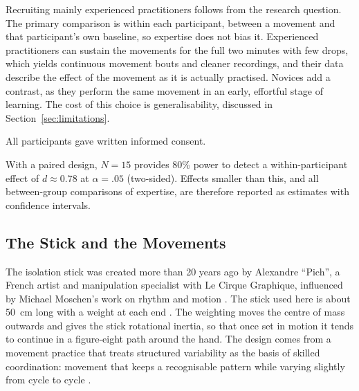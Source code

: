 Recruiting mainly experienced practitioners follows from the research question. The primary comparison is within each participant, between a movement and that participant's own baseline, so expertise does not bias it. Experienced practitioners can sustain the movements for the full two minutes with few drops, which yields continuous movement bouts and cleaner recordings, and their data describe the effect of the movement as it is actually practised. Novices add a contrast, as they perform the same movement in an early, effortful stage of learning. The cost of this choice is generalisability, discussed in Section~\ref{sec:limitations}.

All participants gave written informed consent. 

With a paired design, $N = 15$ provides 80\% power to detect a within-participant effect of $d \approx 0.78$ at $\alpha = .05$ (two-sided). Effects smaller than this, and all between-group comparisons of expertise, are therefore reported as estimates with confidence intervals.

\subsection{The Stick and the Movements}
\label{sec:stick}

The isolation stick was created more than 20 years ago by Alexandre ``Pich'', a French artist and manipulation specialist with Le Cirque Graphique, influenced by Michael Moschen's work on rhythm and motion . The stick used here is about 50~cm long with a weight at each end . The weighting moves the centre of mass outwards and gives the stick rotational inertia, so that once set in motion it tends to continue in a figure-eight path around the hand. The design comes from a movement practice that treats structured variability as the basis of skilled coordination: movement that keeps a recognisable pattern while varying slightly from cycle to cycle .


\begin{figure}[ht]
\centering
{}
\caption{}
\label{fig:stick}
\end{figure}

